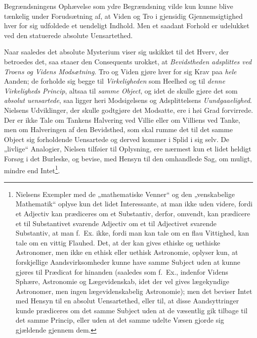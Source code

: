 \documentclass[12pt,a4paper]{book}
\newcommand{\opage}[1]{\marginnote{\footnotesize\textit{[#1]}}}
\begin{document}
Begrændsningens Ophævelse som ydre Begrændsning vilde kun kunne blive tænkelig under
Forudsætning af, at \opage{187}Viden og Tro i gjensidig Gjennemsigtighed hver for sig udfoldede et
uendeligt Indhold. Men et saadant Forhold er udelukket ved den statuerede absolute
Uensartethed.

Naar saaledes det absolute Mysterium viser sig uskikket til det Hverv, der betroedes det, saa
staaer den Consequents urokket, at \emph{Bevidstheden adsplittes ved Troens og Videns
Modsætning}. Tro og Viden gjøre hver for sig Krav paa \emph{hele} Aanden; de forholde sig
begge til \emph{Virkeligheden} som Heelhed og til \emph{denne Virkeligheds Princip}, altsaa til
\emph{samme Object}, og idet de skulle gjøre det som \emph{absolut uensartede}, saa ligger
heri Modsigelsens og Adsplittelsens \emph{Uundgaaelighed}. Nielsens Udviklinger, der skulle
godtgjøre det Modsatte, ere i høi Grad forvirrede. Der er ikke Tale om Tankens Halvering ved
Villie eller om Villiens ved Tanke, men om Halveringen af den Bevidsthed, som skal rumme det til det samme Object sig forholdende Uensartede og derved kommer i Splid i sig selv. De „livlige“
Analogier, Nielsen tilføier til Oplysning, ere nærmest kun et lidet heldigt Forsøg i det
Burleske, og bevise, med Hensyn til den omhandlede Sag, om muligt, mindre end
Intet\footnote{Nielsens Exempler med de „mathematiske Venner“ og den „venskabelige
Mathematik“ oplyse kun det lidet Interessante, at man ikke uden videre, fordi et Adjectiv kan
prædiceres om et Substantiv, derfor, omvendt, kan prædicere et til Substantivet svarende
Adjectiv om et til Adjectivet svarende Substantiv, at man f.\ Ex. ikke, fordi man kan tale om
en flau Vittighed, kan tale om en vittig Flauhed. Det, at der kan gives ethiske og uethiske
Astronomer, men ikke en ethisk eller uethisk Astronomie, oplyser kun, at forskjellige
Aandsvirksomheder kunne have samme Subject uden at kunne gjøres til Prædicat for hinanden
(saaledes som f.\ Ex., indenfor Videns Sphære, Astronomie og Lægevidenskab, idet der vel gives
lægekyndige Astronomer, men ingen lægevidenskabelig Astronomie); men det beviser Intet med
Hensyn til en absolut Uensartethed, eller til, at disse Aandsyttringer kunde prædiceres om det
samme Subject uden at de væsentlig gik tilbage til det samme Princip, eller uden at det samme
udelte Væsen gjorde sig gjældende gjennem dem.}.
\end{document}
